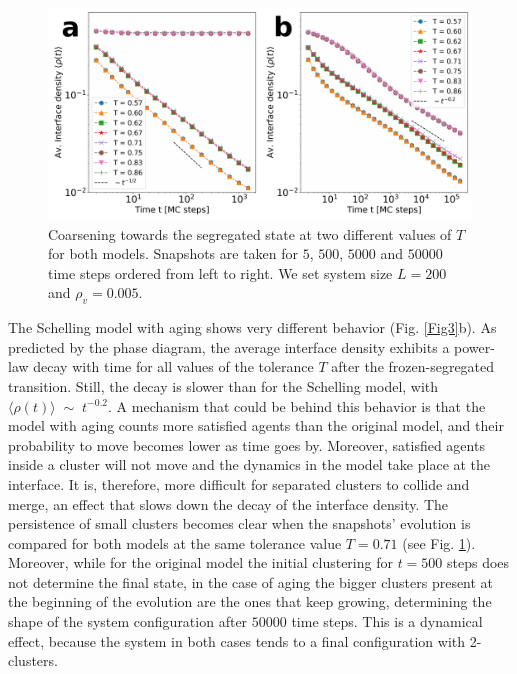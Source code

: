 \begin{figure}
\centering \captionsetup{font=sf}
\includegraphics[width=0.9\linewidth]{Figs/Aging_Schelling/Fig4.pdf} 
\caption[Coarsening towards the segregated state]{Coarsening towards the segregated state at two different values of $T$ for both models. Snapshots are taken for $5$, $500$, $5000$ and $50000$ time steps ordered from left to right. We set system size $L = 200$ and $\rho_v = 0.005$.}
\label{Fig4}
\end{figure}


The Schelling model with aging shows very different behavior (Fig. \ref{Fig3}b). As predicted by the phase diagram, the average interface density exhibits a power-law decay with time for all values of the tolerance $T$ after the frozen-segregated transition. Still, the decay is slower than for the Schelling model, with $\langle \rho (t)\rangle \; \sim \; t^{-0.2}$. A mechanism that could be behind this behavior is that the model with aging counts more satisfied agents than the original model, and their probability to move becomes lower as time goes by. Moreover, satisfied agents inside a cluster will not move and the dynamics in the model take place at the interface. It is, therefore, more difficult for separated clusters to collide and merge, an effect that slows down the decay of the interface density. The persistence of small clusters becomes clear when the snapshots' evolution is compared for both models at the same tolerance value $T = 0.71$ (see Fig. \ref{Fig4}). Moreover, while for the original model the initial clustering for $t = 500$ steps does not determine the final state, in the case of aging the bigger clusters present at the beginning of the evolution are the ones that keep growing, determining the shape of the system configuration after $50000$ time steps. This is a dynamical effect, because the system in both cases tends to a final configuration with 2-clusters.


